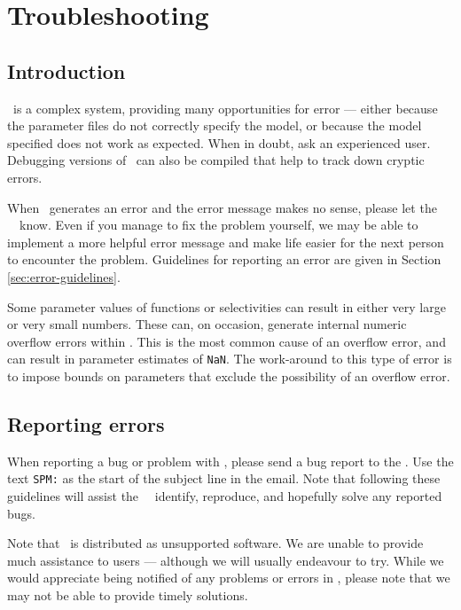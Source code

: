 \section{Troubleshooting\label{sec:trouble-shooting}}

\subsection{Introduction}

\SPM\ is a complex system, providing many opportunities for error --- either because the parameter files do not correctly specify the model, or because the model specified does not work as expected. When in doubt, ask an experienced user. Debugging versions of \SPM\ can also be compiled that help to track down cryptic errors.

When \SPM\ generates an error and the error message makes no sense, please let the \SPM\ \authors\ know. Even if you manage to fix the problem yourself, we may be able to implement a more helpful error message and make life easier for the next person to encounter the problem. Guidelines for reporting an error are given in Section \ref{sec:error-guidelines}.

Some parameter values of functions or selectivities can result in either very large or very small numbers. These can, on occasion, generate internal numeric overflow errors within \SPM. This is the most common cause of an overflow error, and can result in parameter estimates of \texttt{NaN}. The work-around to this type of error is to impose bounds on parameters that exclude the possibility of an overflow error.

\subsection{Reporting errors\label{sec:reporting-errors}}

When reporting a bug or problem with \SPM, please send a bug report to the \authors. Use the text \texttt{SPM:} as the start of the subject line in the email. Note that following these guidelines will assist the \SPM\ \authors\ identify, reproduce, and hopefully solve any reported bugs. 

Note that \SPM\ is distributed as unsupported software. We are unable to provide much assistance to users  --- although we will usually endeavour to try. While we would appreciate being notified of any problems or errors in \SPM, please note that we may not be able to provide timely solutions.

